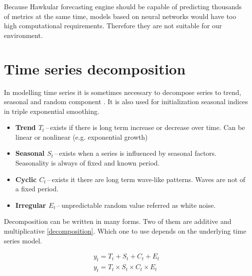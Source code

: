     Because Hawkular forecasting engine should be capable of predicting thousands of metrics at the same time, models
    based on neural networks would have too high computational requirements. Therefore they are not suitable for our
    environment.


    \section{Time series decomposition}
    In modelling time series it is sometimes necessary to decompose series to trend, seasonal and random component
    \cite{otexts}. It is also used for initialization seasonal indices in triple exponential smoothing.

    \begin{itemize}
        \item \textbf{Trend $ T_{t} $}\,--\,exists if there is long term increase or decrease over
            time. Can be linear or nonlinear (e.g. exponential growth)
        \item \textbf{Seasonal $ S_{t} $}\,--\,exists when a series is influenced by seasonal factors.
            Seasonality is always of fixed and known period.
        \item \textbf{Cyclic $ C_{t} $}\,--\,exists it there are long term wave-like patterns.
            Waves are not of a fixed period.
        \item \textbf{Irregular $ E_{t} $}\,--\,unpredictable random value referred as white
            noise. 
    \end{itemize}

    Decomposition can be written in many forms. Two of them are additive and multiplicative \ref{decomposition}.
    Which one to use depends on the underlying time series model.

    \begin{eqnarray} \label{decomposition}
        y_{t} = T_{t} + S_{t} + C_{t} + E_{t} \\
        y_{t} = T_{t} \times S_{t} \times C_{t} \times E_{t}
    \end{eqnarray}


